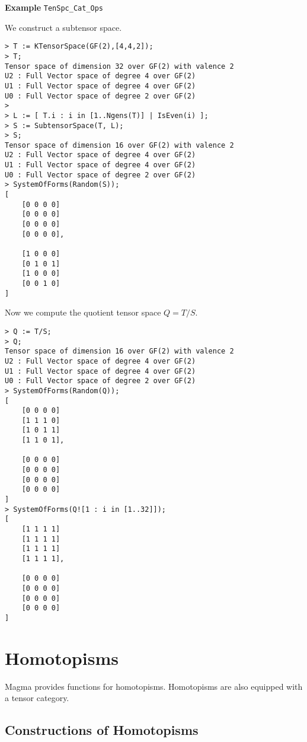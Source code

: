 \begin{framed}{\bf Example} {\tt TenSpc\_Cat\_Ops}\\
{\small We construct a subtensor space.
\begin{lstlisting}[frame=single,basicstyle=\ttfamily\color{black!30!
teal},backgroundcolor=\color{white!70!gray}]
> T := KTensorSpace(GF(2),[4,4,2]);
> T;
Tensor space of dimension 32 over GF(2) with valence 2
U2 : Full Vector space of degree 4 over GF(2)
U1 : Full Vector space of degree 4 over GF(2)
U0 : Full Vector space of degree 2 over GF(2)
> 
> L := [ T.i : i in [1..Ngens(T)] | IsEven(i) ];
> S := SubtensorSpace(T, L);
> S;
Tensor space of dimension 16 over GF(2) with valence 2
U2 : Full Vector space of degree 4 over GF(2)
U1 : Full Vector space of degree 4 over GF(2)
U0 : Full Vector space of degree 2 over GF(2)
> SystemOfForms(Random(S));
[
    [0 0 0 0]
    [0 0 0 0]
    [0 0 0 0]
    [0 0 0 0],

    [1 0 0 0]
    [0 1 0 1]
    [1 0 0 0]
    [0 0 1 0]
]
\end{lstlisting}
Now we compute the quotient tensor space $Q=T/S$.
\begin{lstlisting}[frame=single,basicstyle=\ttfamily\color{black!30!
teal},backgroundcolor=\color{white!70!gray}]
> Q := T/S;
> Q;
Tensor space of dimension 16 over GF(2) with valence 2
U2 : Full Vector space of degree 4 over GF(2)
U1 : Full Vector space of degree 4 over GF(2)
U0 : Full Vector space of degree 2 over GF(2)
> SystemOfForms(Random(Q));
[
    [0 0 0 0]
    [1 1 1 0]
    [1 0 1 1]
    [1 1 0 1],

    [0 0 0 0]
    [0 0 0 0]
    [0 0 0 0]
    [0 0 0 0]
]
> SystemOfForms(Q![1 : i in [1..32]]);
[
    [1 1 1 1]
    [1 1 1 1]
    [1 1 1 1]
    [1 1 1 1],

    [0 0 0 0]
    [0 0 0 0]
    [0 0 0 0]
    [0 0 0 0]
]
\end{lstlisting}
}
\end{framed}

\section{Homotopisms}

Magma provides functions for homotopisms. Homotopisms are also equipped with a tensor category.

\subsection{Constructions of Homotopisms}~

